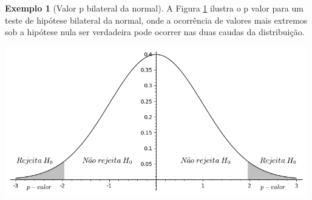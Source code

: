 \documentclass[10pt]{article}
\theoremstyle{plain}
\theoremstyle{remark}
\theoremstyle{definition}
\newtheorem{exe}[teor]{Exemplo}
\begin{document}
\begin{framed}
\begin{exe}[Valor p bilateral da normal]
A Figura \ref{fig:bilateral} ilustra o p valor para um teste de hipótese bilateral da normal, onde a ocorrência de valores mais extremos sob a hipótese nula ser verdadeira pode ocorrer nas duas caudas da distribuição.
\begin{minipage}{\textwidth}
\centering
    \includegraphics[height=6.5cm]{Bilateral.png}
    \label{fig:bilateral}
\end{minipage}
\end{exe}
\end{framed}
\end{document}
